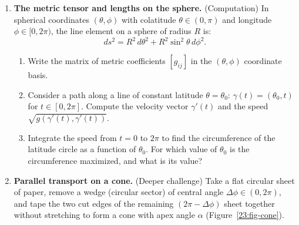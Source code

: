 \begin{enumerate}
\item \textbf{The metric tensor and lengths on the sphere.} (Computation)
In spherical coordinates $(\theta, \phi)$ with colatitude $\theta \in (0, \pi)$ and longitude $\phi \in [0, 2\pi)$, the line element on a sphere of radius $R$ is:
\[
ds^2 = R^2 \, d\theta^2 + R^2 \sin^2\theta \, d\phi^2.
\]
\begin{enumerate}
\item Write the matrix of metric coefficients $[g_{ij}]$ in the $(\theta, \phi)$ coordinate basis.
\item Consider a path along a line of constant latitude $\theta = \theta_0$: $\gamma(t) = (\theta_0, t)$ for $t \in [0, 2\pi]$. Compute the velocity vector $\gamma'(t)$ and the speed $\sqrt{g(\gamma'(t), \gamma'(t))}$.
\item Integrate the speed from $t = 0$ to $2\pi$ to find the circumference of the latitude circle as a function of $\theta_0$. For which value of $\theta_0$ is the circumference maximized, and what is its value?
\end{enumerate}

\item \textbf{Parallel transport on a cone.} (Deeper challenge)
Take a flat circular sheet of paper, remove a wedge (circular sector) of central angle $\Delta\phi \in (0, 2\pi)$, and tape the two cut edges of the remaining $(2\pi - \Delta\phi)$ sheet together without stretching to form a cone with apex angle $\alpha$ (Figure~\ref{23:fig-cone}).

\begin{figure}[htbp]
\centering
{}
\end{figure}
\end{enumerate}
